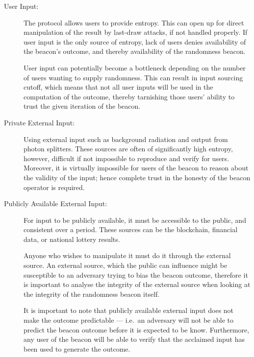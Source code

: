 \begin{description}
    \item[User Input:]
        The protocol allows users to provide entropy.
        This can open up for direct manipulation of the result by last-draw attacks, if not handled properly.
        If user input is the only source of entropy, lack of users denies availability of the beacon's outcome, and thereby availability of the randomness beacon.

        User input can potentially become a bottleneck depending on the number of users wanting to supply randomness.
        This can result in input sourcing cutoff, which means that not all user inputs will be used in the computation of the outcome, thereby tarnishing those users' ability to trust the given iteration of the beacon.

    \item[Private External Input:]
        Using external input such as background radiation and output from photon splitters.
        These sources are often of significantly high entropy, however, difficult if not impossible to reproduce and verify for users.
        Moreover, it is virtually impossible for users of the beacon to reason about the validity of the input; hence complete trust in the honesty of the beacon operator is required.

    \item[Publicly Available External Input:]
        For input to be publicly available, it must be accessible to the public, and consistent over a period.
        These sources can be the blockchain, financial data, or national lottery results.

        Anyone who wishes to manipulate it must do it through the external source.
        An external source, which the public can influence might be susceptible to an adversary trying to bias the beacon outcome, therefore it is important to analyse the integrity of the external source when looking at the integrity of the randomness beacon itself.

        It is important to note that publicly available external input does not make the outcome predictable --- i.e.\ an adversary will not be able to predict the beacon outcome before it is expected to be know.
        Furthermore, any user of the beacon will be able to verify that the acclaimed input has been used to generate the outcome.

\end{description}

